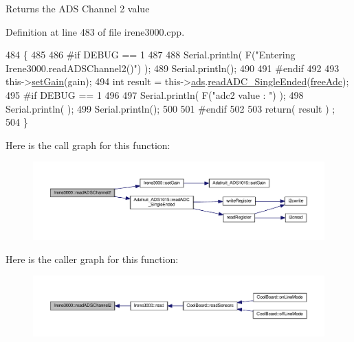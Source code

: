 \begin{DoxyReturn}{Returns}
the A\+DS Channel 2 value 
\end{DoxyReturn}


Definition at line 483 of file irene3000.\+cpp.


\begin{DoxyCode}
484 \{   
485 
486 \textcolor{preprocessor}{#if DEBUG == 1 }
487     
488     Serial.println( F(\textcolor{stringliteral}{"Entering Irene3000.readADSChannel2()"}) );
489     Serial.println();
490 
491 \textcolor{preprocessor}{#endif}
492 
493     this->\hyperlink{class_irene3000_aff7c5da186b388e7272e63ff88a20c34}{setGain}(gain);
494     \textcolor{keywordtype}{int} result = this->\hyperlink{class_irene3000_a1215e77ba761c9908d80d691f149e135}{ads}.\hyperlink{class_adafruit___a_d_s1015_a40f38b9e1f3ec397c0670dd632510235}{readADC\_SingleEnded}(\hyperlink{_irene3000_8h_a55497513af255250e464ed76543d46d7}{freeAdc});
495 \textcolor{preprocessor}{#if DEBUG == 1 }
496     
497     Serial.println( F(\textcolor{stringliteral}{"adc2 value : "}) );
498     Serial.println( );
499     Serial.println();
500 
501 \textcolor{preprocessor}{#endif}
502 
503     \textcolor{keywordflow}{return}( result ) ;
504 \}
\end{DoxyCode}
Here is the call graph for this function\+:\nopagebreak
\begin{figure}[H]
\begin{center}
\leavevmode
\includegraphics[width=350pt]{d6/d03/class_irene3000_ae73bd2ed14a199a7e83f4d6458476a7c_cgraph}
\end{center}
\end{figure}
Here is the caller graph for this function\+:\nopagebreak
\begin{figure}[H]
\begin{center}
\leavevmode
\includegraphics[width=350pt]{d6/d03/class_irene3000_ae73bd2ed14a199a7e83f4d6458476a7c_icgraph}
\end{center}
\end{figure}
\mbox{\label{class_irene3000_a78a87eb7cf295b95c12b2ebd51c2bb77}} 
